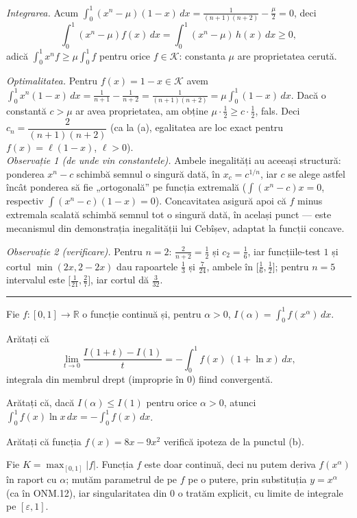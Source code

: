\emph{Integrarea.} Acum $\int_0^1(x^{n}-\mu)(1-x)\,dx=\frac{1}{(n+1)(n+2)}-\frac{\mu}{2}=0$, deci
\[ \int_0^1(x^{n}-\mu)f(x)\,dx=\int_0^1(x^{n}-\mu)\,h(x)\,dx\ge0 , \]
adică $\int_0^1x^{n}f\ge\mu\int_0^1f$ pentru orice $f\in\mathcal{K}$: constanta $\mu$ are proprietatea cerută.

\emph{Optimalitatea.} Pentru $f(x)=1-x\in\mathcal{K}$ avem $\int_0^1x^{n}(1-x)\,dx=\frac{1}{n+1}-\frac{1}{n+2}=\frac{1}{(n+1)(n+2)}=\mu\int_0^1(1-x)\,dx$. Dacă o constantă $c>\mu$ ar avea proprietatea, am obține $\mu\cdot\frac12\ge c\cdot\frac12$, fals. Deci $c_{n}=\dfrac{2}{(n+1)(n+2)}$ (ca la (a), egalitatea are loc exact pentru $f(x)=\ell(1-x)$, $\ell>0$).\\[2pt]
\emph{Observație 1 (de unde vin constantele).} Ambele inegalități au aceeași structură: ponderea $x^{n}-c$ schimbă semnul o singură dată, în $x_{c}=c^{1/n}$, iar $c$ se alege astfel încât ponderea să fie „ortogonală'' pe funcția extremală ($\int(x^{n}-c)x=0$, respectiv $\int(x^{n}-c)(1-x)=0$). Concavitatea asigură apoi că $f$ minus extremala scalată schimbă semnul tot o singură dată, în același punct --- este mecanismul din demonstrația inegalității lui Cebîșev, adaptat la funcții concave.

\emph{Observație 2 (verificare).} Pentru $n=2$: $\frac{2}{n+2}=\frac12$ și $c_{2}=\frac16$, iar funcțiile-test $1$ și cortul $\min(2x,2-2x)$ dau rapoartele $\frac13$ și $\frac{7}{24}$, ambele în $\bigl[\frac16,\frac12\bigr]$; pentru $n=5$ intervalul este $\bigl[\frac1{21},\frac27\bigr]$, iar cortul dă $\frac{3}{32}$.
\vspace{1mm}\hrule

Fie $f:[0,1]\to\mathbb{R}$ o funcție continuă și, pentru $\alpha>0$,
$I(\alpha)=\displaystyle\int_0^1 f(x^{\alpha})\,dx$.
\begin{parti}
  \item Arătați că
        \[ \lim_{t\to0}\frac{I(1+t)-I(1)}{t}=-\int_0^1 f(x)\,(1+\ln x)\,dx , \]
        integrala din membrul drept (improprie în $0$) fiind convergentă.
  \item Arătați că, dacă $I(\alpha)\le I(1)$ pentru orice $\alpha>0$, atunci
        $\displaystyle\int_0^1 f(x)\ln x\,dx=-\int_0^1 f(x)\,dx$.
  \item Arătați că funcția $f(x)=8x-9x^{2}$ verifică ipoteza de la punctul (b).
\end{parti}
\sol Fie $K=\max_{[0,1]}|f|$. Funcția $f$ este doar continuă, deci nu putem deriva $f(x^{\alpha})$ în raport cu $\alpha$; mutăm parametrul de pe $f$ pe o putere, prin substituția $y=x^{\alpha}$ (ca în ONM.12), iar singularitatea din $0$ o tratăm explicit, cu limite de integrale pe $[\varepsilon,1]$.

